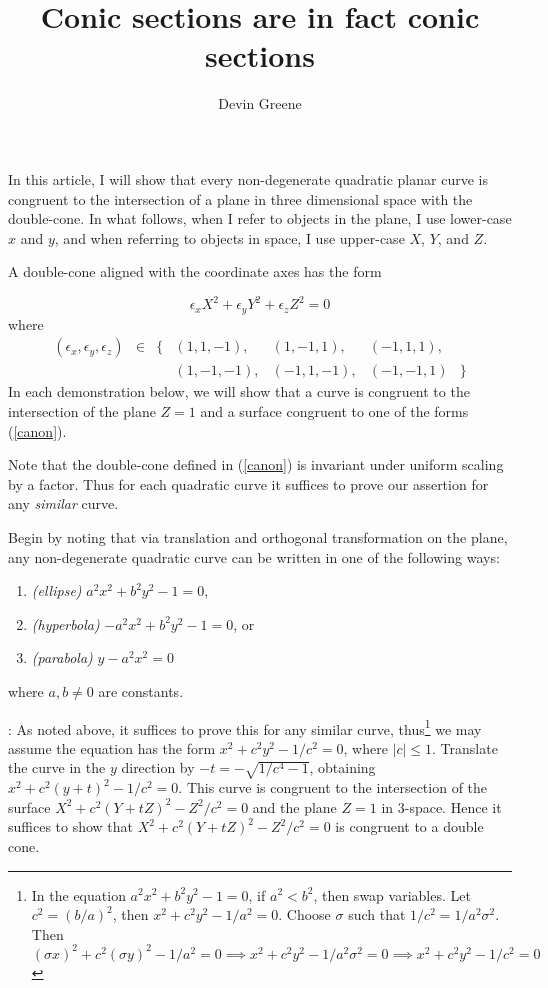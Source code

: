 \documentclass[12pt]{article}
\title{Conic sections are in fact conic sections}
\author{Devin Greene}
\date{}
\newcommand{\eps}{\epsilon}
\begin{document}
\maketitle

In this article, I will show that every non-degenerate quadratic
planar curve is congruent to the intersection of a plane in three
dimensional space with the double-cone.  In what follows, when I 
refer to objects in the plane, I use lower-case $x$ and $y$, and
when referring to objects in space, I use upper-case $X$, $Y$, and
$Z$.

A double-cone aligned with the coordinate axes has the form 

\begin{equation} \label{canon} \eps_x X^2 + \eps_y Y^2 + \eps_z
Z^2 = 0\end{equation}
where
$$\begin{matrix}(\eps_x,\eps_y,\eps_z) & \in  &
\{ &(1,1,-1),&(1,-1,1),&(-1,1,1), &\\
&&&(1,-1,-1),&(-1,1,-1),&(-1,-1,1) &\}\end{matrix}$$
In each demonstration below, we will show that a curve is congruent to
the intersection of the plane $Z = 1$ and a surface congruent to one
of the forms (\ref{canon}).

Note that the double-cone defined in (\ref{canon}) is invariant under
uniform scaling by a factor.  Thus for each quadratic curve it
suffices to prove our assertion for any {\it similar} curve.

Begin by noting that via translation and orthogonal transformation on
the plane, any non-degenerate quadratic curve can be written in one of
the following ways:

\begin{enumerate}
\item {\it (ellipse)} $a^2x^2 + b^2y^2 - 1 = 0$,
\item {\it (hyperbola)} $-a^2x^2 + b^2y^2 - 1 = 0$, or
\item {\it (parabola)} $y - a^2x^2 = 0$
\end{enumerate}
where $a,b \neq 0$ are constants.

\medskip

: As noted above, it suffices to prove this for
any similar curve, thus\footnote{
In the equation $a^2x^2 + b^2y^2 - 1 = 0$, if $a^2 < b^2$, then swap
variables.  Let $c^2 = (b/a)^2$, then $x^2 + c^2 y^2 - 1/a^2 = 0$.
Choose $\sigma$ such that $1/c^2 = 1/a^2\sigma^2$.  Then
$(\sigma x)^2
+ c^2 (\sigma y)^2 - 1/a^2 = 0 \implies x^2  + c^2 y^2 - 1/a^2\sigma^2
= 0 \implies x^2 + c^2 y^2 - 1/c^2 = 0$
}
we may assume the
equation has the form $x^2 + c^2 y^2 - 1/c^2 = 0$, where $|c| \leq 1$. Translate the curve in the $y$ direction by $-t = -\sqrt{1/c^4 - 1}$,
obtaining $x^2 + c^2 (y + t)^2 - 1/c^2 = 0$.  This curve is congruent to
the intersection of the surface $X^2 + c^2 (Y + tZ)^2 - Z^2/c^2 = 0$ and
the plane $Z = 1$ in 3-space.  Hence it suffices to show that $ X^2 +
c^2 (Y + tZ)^2 - Z^2/c^2 = 0$ is congruent to a double cone.
\end{document}
